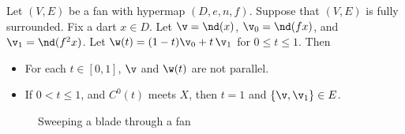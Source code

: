 \begin{lemma}[sweep]\label{lemma:sweep}  
Let $(V,E)$ be a fan with hypermap $(D,e,n,f)$.  
Suppose that $(V,E)$ is fully surrounded. Fix a dart $x\in D$.
Let $\v = \nd(x)$, $\v_0 = \nd(f x)$,
and $\v_1 = \nd(f^2 x)$.  Let $\w(t) = (1-t) \v_0 + t\, \v_1$ for
$0\le t\le 1$.  Then
\begin{itemize}
\item  For each $t\in[0,1]$, $\v$ and $\w(t)$ are not parallel.
\item If $0 < t \le 1$, and $C^0(t)$ meets $X$, then $t=1$ and
$\{\v,\v_1\}\in E$.
\end{itemize}
\end{lemma}


\begin{figure}[htb]
\centering
{}
\caption{Sweeping a blade through a fan}
\label{fig:vt}
\end{figure}


